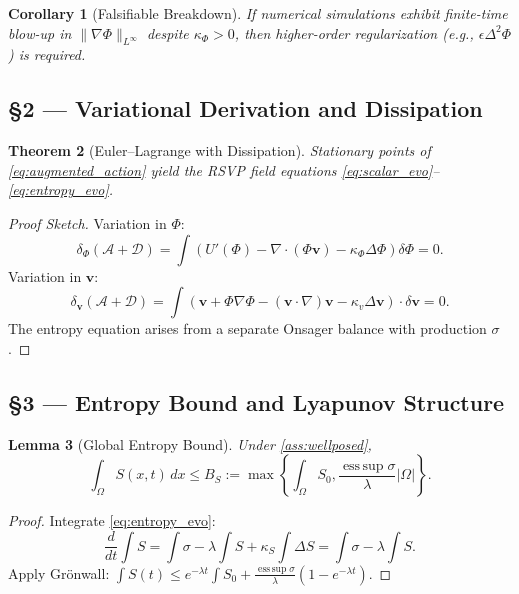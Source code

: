 \documentclass[11pt]{article}
\newtheorem{theorem}{Theorem}[section]
\newtheorem{lemma}[theorem]{Lemma}
\newtheorem{corollary}[theorem]{Corollary}
\theoremstyle{definition}
\theoremstyle{remark}
\newcommand{\vect}[1]{\bm{#1}}
\newcommand{\norm}[1]{\lVert #1\rVert}
\DeclareMathOperator{\esssup}{ess\,sup}
\begin{document}
\begin{corollary}[Falsifiable Breakdown]
If numerical simulations exhibit finite-time blow-up in $\norm{\nabla \Phi}_{L^\infty}$ despite $\kappa_\Phi > 0$, then higher-order regularization (e.g., $\epsilon \Delta^2 \Phi$) is required.
\end{corollary}

\subsection*{§2 — Variational Derivation and Dissipation}

\begin{theorem}[Euler--Lagrange with Dissipation]
Stationary points of \eqref{eq:augmented_action} yield the RSVP field equations \eqref{eq:scalar_evo}--\eqref{eq:entropy_evo}.
\end{theorem}

\begin{proof}[Proof Sketch]
Variation in $\Phi$:
\[
\delta_\Phi (\mathcal{A} + \mathcal{D}) = \int \left( U'(\Phi) - \nabla \cdot (\Phi \vect{v}) - \kappa_\Phi \Delta \Phi \right) \delta \Phi = 0.
\]
Variation in $\vect{v}$:
\[
\delta_{\vect{v}} (\mathcal{A} + \mathcal{D}) = \int \left( \vect{v} + \Phi \nabla \Phi - (\vect{v} \cdot \nabla) \vect{v} - \kappa_v \Delta \vect{v} \right) \cdot \delta \vect{v} = 0.
\]
The entropy equation arises from a separate Onsager balance with production $\sigma$.
\end{proof}

\subsection*{§3 — Entropy Bound and Lyapunov Structure}

\begin{lemma}[Global Entropy Bound]
Under \cref{ass:wellposed},
\[
\int_\Omega S(x,t)\,dx \le B_S := \max\left\{ \int_\Omega S_0, \frac{\esssup \sigma}{\lambda} |\Omega| \right\}.
\]
\end{lemma}

\begin{proof}
Integrate \eqref{eq:entropy_evo}:
\[
\frac{d}{dt} \int S = \int \sigma - \lambda \int S + \kappa_S \int \Delta S = \int \sigma - \lambda \int S.
\]
Apply Grönwall: $\int S(t) \le e^{-\lambda t} \int S_0 + \frac{\esssup \sigma}{\lambda} (1 - e^{-\lambda t})$.
\end{proof}
\end{document}

